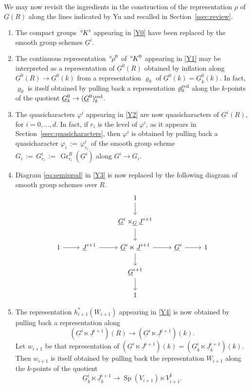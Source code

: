 \documentclass[10pt]{amsart}
\makeatletter
\theoremstyle{plain}
\theoremstyle{definition}
\newcommand{\Fq}{k}
\DeclareMathOperator{\Gr}{Gr}
\newcommand{\ceq}{{\, :=\, }}
\newcommand{\labitem}[2]{
\def\@itemlabel{\textbf{#1}}
\item
\def\@currentlabel{#1}\label{#2}}
\newcommand{\Sp}{{\operatorname{Sp}}}
\newcommand{\oK}{{\,^\circ \hskip-1pt K}}
\newcommand{\orho}{{\,^\circ \hskip-1pt \rho}}
\makeatother
\begin{document}
We may now revisit the ingredients in the construction of the representation $\rho$ of $\underline{G}(R)$ along the lines indicated by Yu and recalled in Section~\ref{ssec:review}.
\begin{enumerate}
\labitem{M0}{M0}
The compact groups $\oK^i$ appearing in \ref{Y0} have been replaced by the smooth group schemes $\underline{G}^i$.
\labitem{M1}{M1}
The continuous representation $\orho^0$ of $\oK^0$ appearing in \ref{Y1} may be interpreted as a representation of $\underline{G}^0(R)$ obtained by inflation along $\underline{G}^0(R) \to \underline{G}^0(\Fq)$ from a representation $\varrho_0$ of $\underline{G}^0(\Fq) = \underline{G}^0_\Fq(\Fq)$.
In fact, $\varrho_0$ is itself obtained by pulling back a representation $\varrho_0^{\operatorname{red}}$ along the $\Fq$-points of the quotient $\underline{G}^0_\Fq \to (\underline{G}^0)_\Fq^\reductive$.
\labitem{M2}{M2} The quasicharacters $\varphi^i$ appearing in \ref{Y2} are now quasicharacters of $\underline{G}^i(R)$, for $i=0, \ldots, d$.
In fact, if $r_i$ is the level of $\varphi^i$, as it appears in Section~\ref{ssec:quasicharacters}, then $\varphi^i$ is obtained by pulling back a quasicharacter $\varphi_i\ceq \varphi^i_{r_i}$ of the smooth group scheme $G_i\ceq G^i_{r_i} \ceq \Gr_{r_i}^{R}(\underline{G}^i)$ along $G^i \to G_i$.
\labitem{M3}{M3}
Diagram \eqref{eq:semiprod} in \ref{Y3} is now replaced by the following diagram of smooth group schemes over $R$.
\begin{equation}\label{eq:pimodel}
\begin{tikzcd}
\ && 1 \arrow{d} && \\
\ && \underline{G}^{i}\times_{\underline{G}} \underline{J}^{i+1}\arrow{d} && \\
1 \arrow{r} & \underline{J}^{i+1} \arrow{r} & \underline{G}^i \ltimes \underline{J}^{i+1} \arrow{d} \arrow{r} & \underline{G}^i \arrow{r} & 1\\
&& \underline{G}^{i+1} \arrow{d} && \\
&& 1 &&
\end{tikzcd}
\end{equation}
\labitem{M4}{M4}
The representation $h_{i+1}^*(W_{i+1})$ appearing in \ref{Y4} is now obtained by pulling back a representation along 
\[
(\underline{G}^i \ltimes \underline{J}^{i+1})(R) \to (\underline{G}^i \ltimes \underline{J}^{i+1})(\Fq).
\]
Let $w_{i+1}$ be that representation of $(\underline{G}^i \ltimes \underline{J}^{i+1})(\Fq) = (\underline{G}_\Fq^i \ltimes \underline{J}^{i+1}_\Fq)(\Fq)$. 
Then $w_{i+1}$ is itself obtained by pulling back the representation $W_{i+1}$ along the $\Fq$-points of the quotient
\[
\underline{G}_\Fq^i \ltimes \underline{J}^{i+1}_\Fq \to 
\Sp(V_{i+1}) \ltimes V_{i+1}^\sharp.
\]
\end{enumerate}
\end{document}
